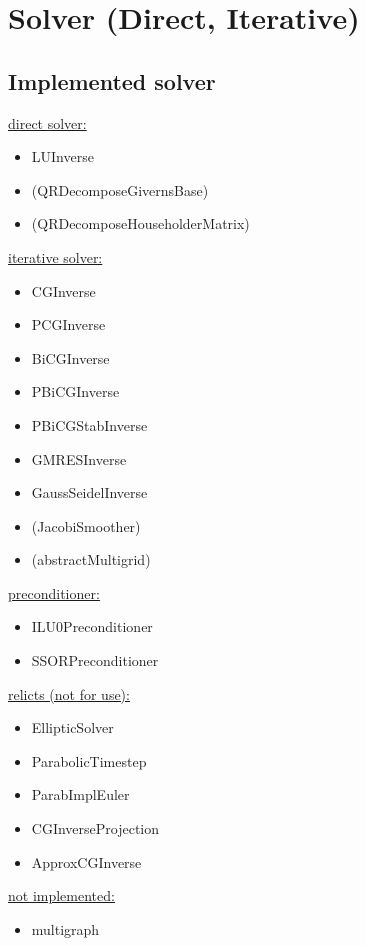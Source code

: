 

\chapter{Solver (Direct, Iterative)}
\section{Implemented solver}

\begin{minipage}{\linewidth}
\begin{minipage}[t]{0.5\linewidth}
\underline{ direct solver: }
\begin{itemize}
\item LUInverse
\item (QRDecomposeGivernsBase)
\item (QRDecomposeHouseholderMatrix)
\end{itemize}
\underline{ iterative solver: }
\begin{itemize}
\item CGInverse
\item PCGInverse
\item BiCGInverse
\item PBiCGInverse
\item PBiCGStabInverse
\item GMRESInverse
\item GaussSeidelInverse
\item (JacobiSmoother)
\item (abstractMultigrid)
\end{itemize}
\end{minipage}
\begin{minipage}[t]{0.5\linewidth}
\underline{ preconditioner: }
\begin{itemize}
\item ILU0Preconditioner
\item SSORPreconditioner
\end{itemize}
\underline{ relicts (not for use): }
\begin{itemize}
\item EllipticSolver
\item ParabolicTimestep
\item ParabImplEuler
\item CGInverseProjection
\item ApproxCGInverse
\end{itemize}
\underline{ not implemented: }
\begin{itemize}
\item multigraph
\end{itemize}
\end{minipage}
\end{minipage}

